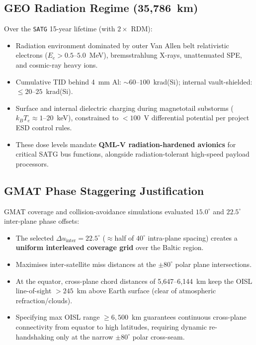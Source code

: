 \subsection{GEO Radiation Regime (35,786~km)}

Over the \texttt{SATG} 15-year lifetime (with $2\times$ RDM):
\begin{itemize}
    \item Radiation environment dominated by outer Van Allen belt relativistic electrons ($E_e > 0.5$--$5.0$~MeV), bremsstrahlung X-rays, unattenuated SPE, and cosmic-ray heavy ions.
    \item Cumulative TID behind 4~mm Al: ${\sim}60$--$100$~krad(Si); internal vault-shielded: $\le 20$--$25$~krad(Si).
    \item Surface and internal dielectric charging during magnetotail substorms ($k_B T_e \approx 1$--$20$~keV), constrained to $< 100$~V differential potential per project ESD control rules.
    \item These dose levels mandate \textbf{QML-V radiation-hardened avionics} for critical SATG bus functions, alongside radiation-tolerant high-speed payload processors.
\end{itemize}

\subsection{GMAT Phase Staggering Justification}

GMAT coverage and collision-avoidance simulations evaluated $15.0^\circ$ and $22.5^\circ$ inter-plane phase offsets:
\begin{itemize}
    \item The selected $\Delta u_{\text{inter}} = 22.5^\circ$ (${\approx}$half of $40^\circ$ intra-plane spacing) creates a \textbf{uniform interleaved coverage grid} over the Baltic region.
    \item Maximises inter-satellite miss distances at the $\pm 80^\circ$ polar plane intersections.
    \item At the equator, cross-plane chord distances of 5,647--6,144~km keep the OISL line-of-sight $> 245$~km above Earth surface (clear of atmospheric refraction/clouds).
    \item Specifying max OISL range $\ge 6{,}500$~km guarantees continuous cross-plane connectivity from equator to high latitudes, requiring dynamic re-handshaking only at the narrow $\pm 80^\circ$ polar cross-seam.
\end{itemize}

